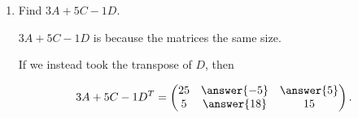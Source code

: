 \documentclass{ximera}
\begin{document}
\begin{exploration}
\begin{enumerate}
\begin{solution}
\end{solution}

\item Find $3A+5C-1D$.

\begin{solution}

  $3A+5C-1D$ is  because the matrices  the same size.

  \begin{problem}

    If we instead took the transpose of $D$, then 
    
    $$3A+5C-1D^T=\begin{pmatrix} 25 & \answer{-5} & \answer{5} \\ 5 & \answer{18} & 15 \end{pmatrix}.$$

  \end{problem}

\end{solution}

\end{enumerate}

\end{exploration}
\end{document}

